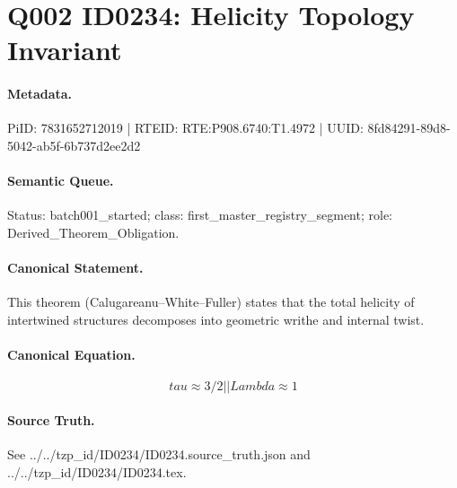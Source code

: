 \section*{Q002 ID0234: Helicity Topology Invariant}
\paragraph{Metadata.}
PiID: 7831652712019 | RTEID: RTE:P908.6740:T1.4972 | UUID: 8fd84291-89d8-5042-ab5f-6b737d2ee2d2

\paragraph{Semantic Queue.}
Status: batch001\_started; class: first\_master\_registry\_segment; role: Derived\_Theorem\_Obligation.

\paragraph{Canonical Statement.}
This theorem (Calugareanu--White--Fuller) states that the total helicity of intertwined structures decomposes into geometric writhe and internal twist.

\paragraph{Canonical Equation.}
\[
tau \approx 3/2 || Lambda \approx 1
\]

\paragraph{Source Truth.}
See ../../tzp\_id/ID0234/ID0234.source\_truth.json and ../../tzp\_id/ID0234/ID0234.tex.
